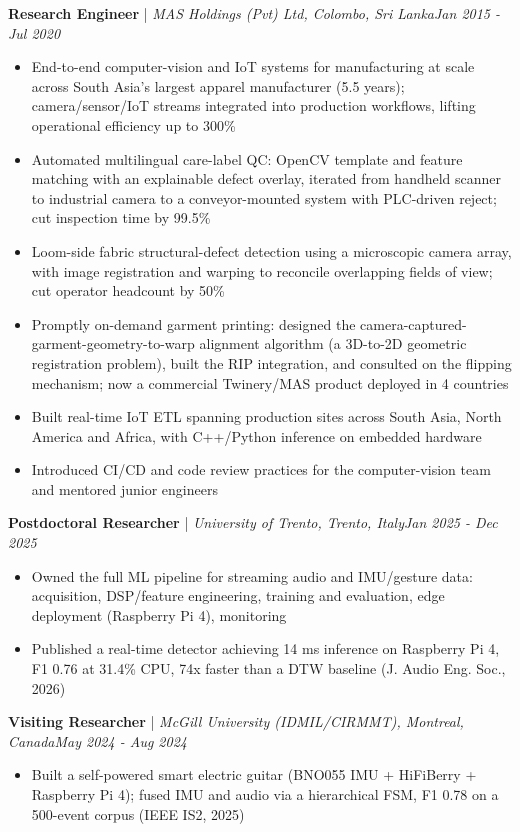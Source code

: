 \documentclass[11pt]{article}
\newenvironment{cvrole}[5]{%
  \par\noindent\textbf{\large #1} | \textit{\small #2, #3}\hfill \textit{\small #4 - #5}\par
  \begin{itemize}[leftmargin=2em, itemsep=-0.3em, topsep=-0.5em]%
}{%
  \end{itemize}\par\noindent\mbox{}\par\vspace{0.1em}%
}
\begin{document}
\begin{cvrole}{Research Engineer}{MAS Holdings (Pvt) Ltd}{Colombo, Sri Lanka}{Jan 2015}{Jul 2020}
    \item End-to-end computer-vision and IoT systems for manufacturing at scale across South Asia's
    largest apparel manufacturer (5.5 years); camera/sensor/IoT streams integrated into production
    workflows, lifting operational efficiency up to 300\%
    \item Automated multilingual care-label QC: OpenCV template and feature matching with an
    explainable defect overlay, iterated from handheld scanner to industrial camera to a
    conveyor-mounted system with PLC-driven reject; cut inspection time by 99.5\%
    \item Loom-side fabric structural-defect detection using a microscopic camera array, with image
    registration and warping to reconcile overlapping fields of view; cut operator headcount by 50\%
    \item Promptly on-demand garment printing: designed the camera-captured-garment-geometry-to-warp
    alignment algorithm (a 3D-to-2D geometric registration problem), built the RIP integration, and
    consulted on the flipping mechanism; now a commercial Twinery/MAS product deployed in 4 countries
    \item Built real-time IoT ETL spanning production sites across South Asia, North America and
    Africa, with C++/Python inference on embedded hardware
    \item Introduced CI/CD and code review practices for the computer-vision team and mentored
    junior engineers
\end{cvrole}

\begin{cvrole}{Postdoctoral Researcher}{University of Trento}{Trento, Italy}{Jan 2025}{Dec 2025}
    \item Owned the full ML pipeline for streaming audio and IMU/gesture data: acquisition,
    DSP/feature engineering, training and evaluation, edge deployment (Raspberry Pi 4), monitoring
    \item Published a real-time detector achieving 14 ms inference on Raspberry Pi 4, F1 0.76 at
    31.4\% CPU, 74x faster than a DTW baseline (J. Audio Eng. Soc., 2026)
\end{cvrole}

\begin{cvrole}{Visiting Researcher}{McGill University (IDMIL/CIRMMT)}{Montreal, Canada}{May 2024}{Aug 2024}
    \item Built a self-powered smart electric guitar (BNO055 IMU + HiFiBerry + Raspberry Pi 4);
    fused IMU and audio via a hierarchical FSM, F1 0.78 on a 500-event corpus (IEEE IS2, 2025)
\end{cvrole}
\end{document}
